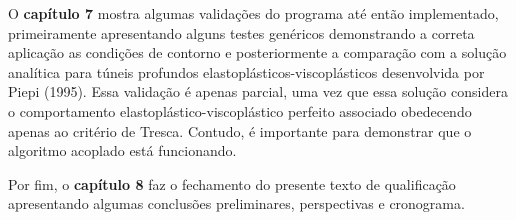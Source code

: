 O \textbf{capítulo 7} mostra algumas validações do programa até então implementado, primeiramente apresentando alguns testes genéricos demonstrando a correta aplicação as condições de contorno e posteriormente a comparação com a solução analítica para túneis profundos elastoplásticos-viscoplásticos desenvolvida por Piepi (1995). Essa validação é apenas parcial, uma vez que essa solução considera o comportamento elastoplástico-viscoplástico perfeito associado obedecendo apenas ao critério de Tresca. Contudo, é importante para demonstrar que o algoritmo acoplado está funcionando.

Por fim, o \textbf{capítulo 8} faz o fechamento do presente texto de qualificação apresentando algumas conclusões preliminares, perspectivas e cronograma.


 
